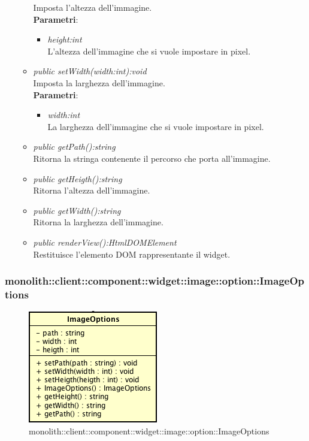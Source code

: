 \begin{itemize}
\begin{itemize}
	Imposta l'altezza dell'immagine.
		\\ \textbf{Parametri}: \begin{itemize}
		\item \textit{height:int}\\
		L'altezza dell'immagine che si vuole impostare in pixel.
		\end{itemize} 
	\item \textit{public setWidth(width:int):void}\\
	Imposta la larghezza dell'immagine.
		\\ \textbf{Parametri}: \begin{itemize}
		\item \textit{width:int}\\
		La larghezza dell'immagine che si vuole impostare in pixel.
		\end{itemize} 
	\item \textit{public getPath():string}\\
	Ritorna la stringa contenente il percorso che porta all'immagine.
	\item \textit{public getHeigth():string}\\
	Ritorna l'altezza dell'immagine.
	\item \textit{public getWidth():string}\\
	Ritorna la larghezza dell'immagine.
	\item \textit{public renderView():HtmlDOMElement}\\
	Restituisce l'elemento DOM rappresentante il widget.
	\end{itemize}
\end{itemize}

\subsubsection{monolith::client::component::widget::image::option::ImageOptions}

\label{monolith::client::component::widget::image::option::ImageOptions}
\begin{figure}[H]
	\centering
	\includegraphics[scale=0.5]{Sezioni/SottosezioniST/img/ImageOptions.png}
	\caption{monolith::client::component::widget::image::option::ImageOptions}
\end{figure}

